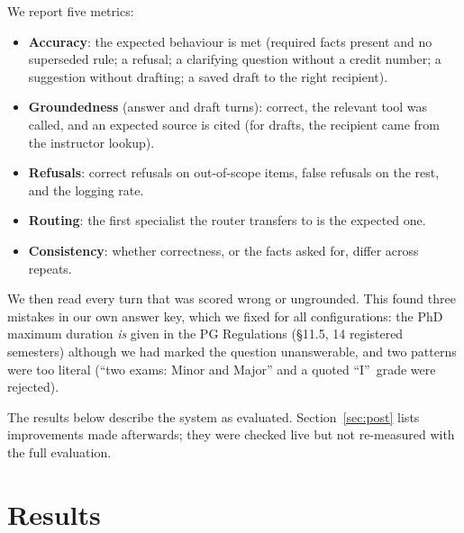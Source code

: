 \documentclass[10pt,a4paper]{article}
\begin{document}
We report five metrics:
\begin{itemize}
\item \textbf{Accuracy}: the expected behaviour is met (required facts present and no superseded rule; a refusal; a
  clarifying question without a credit number; a suggestion without drafting; a saved draft to the right recipient).
\item \textbf{Groundedness} (answer and draft turns): correct, the relevant tool was called, and an expected source is
  cited (for drafts, the recipient came from the instructor lookup).
\item \textbf{Refusals}: correct refusals on out-of-scope items, false refusals on the rest, and the logging rate.
\item \textbf{Routing}: the first specialist the router transfers to is the expected one.
\item \textbf{Consistency}: whether correctness, or the facts asked for, differ across repeats.
\end{itemize}
We then read every turn that was scored wrong or ungrounded. This found three mistakes in our own answer key,
which we fixed for all configurations: the PhD maximum duration \emph{is} given in the PG Regulations (\S11.5, 14
registered semesters) although we had marked the question unanswerable, and two patterns were too literal (``two
exams: Minor and Major'' and a quoted ``I''~grade were rejected).

The results below describe the system as evaluated. Section~\ref{sec:post} lists improvements made afterwards;
they were checked live but not re-measured with the full evaluation.

\section{Results}
\begin{table}[H]
\centering\small
{}
\caption{Headline metrics, all repeats pooled (93 turns per configuration; 69 answer/draft turns for
groundedness; 18 out-of-scope turns). All refused out-of-scope questions were logged.}
\label{tab:headline}
\end{table}
\end{document}
